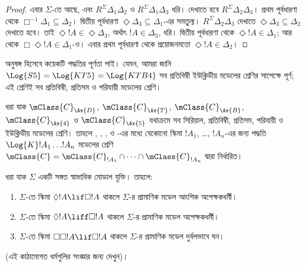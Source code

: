 \documentclass[../../../include/open-logic-section]{subfiles}
\begin{document}
\begin{proof}
  এবার $\Sigma$-তে  আছে, এবং $R^\Sigma
  \Delta_1\Delta_2$ ও $R^\Sigma \Delta_1\Delta_3$ ধরি। দেখাতে হবে $R^\Sigma \Delta_2\Delta_3$। প্রথম পূর্বধারণা থেকে $\Box^{-1}\Delta_1 \subseteq \Delta_2$। দ্বিতীয় পূর্বধারণা $\Diamond\Delta_3 \subseteq \Delta_1$-এর সমতুল্য। $R^\Sigma
  \Delta_2\Delta_3$ দেখাতে $\Diamond\Delta_3 \subseteq \Delta_2$ দেখাতে হবে। তাই $\Diamond!A \in
  \Diamond\Delta_3$, অর্থাৎ $!A \in \Delta_3$, ধরি। দ্বিতীয় পূর্বধারণা থেকে $\Diamond!A \in \Delta_1$; আর  থেকে $\Box\Diamond!A \in
  \Delta_1$-ও। এবার প্রথম পূর্বধারণা থেকে প্রয়োজনমতো $\Diamond!A \in
  \Delta_2$।
  \end{proof}

অনুষঙ্গ হিসেবে কয়েকটি পদ্ধতির পূর্ণতা পাই। যেমন, আমরা জানি $\Log{S5} = \Log{KT5} =
\Log{KTB4}$ সব প্রতিবিম্বী ইউক্লিডীয় মডেলের শ্রেণির সাপেক্ষে পূর্ণ; এই শ্রেণিই সব প্রতিবিম্বী, প্রতিসম ও পরিযায়ী মডেলের শ্রেণি।

\begin{thm}
  ধরা যাক $\mClass{C}_\Ax{D}$, $\mClass{C}_\Ax{T}$,
  $\mClass{C}_\Ax{B}$, $\mClass{C}_\Ax{4}$ ও
  $\mClass{C}_\Ax{5}$ যথাক্রমে সব সিরিয়াল, প্রতিবিম্বী, প্রতিসম, পরিযায়ী ও ইউক্লিডীয় মডেলের শ্রেণি। তাহলে ,
  , ,  ও -এর মধ্যে যেকোনো স্কিমা $!A_1$, \dots, $!A_n$-এর জন্য পদ্ধতি
  $\Log{K}!A_1 \dots !A_n$ মডেলের শ্রেণি $\mClass{C} = \mClass{C}_{!A_1} \cap \dots
  \cap \mClass{C}_{!A_n}$ দ্বারা নির্ধারিত।
\end{thm}

\begin{prop}
  ধরা যাক $\Sigma$ একটি সঙ্গত স্বাভাবিক মোডাল যুক্তি। তাহলে:
  \begin{enumerate}
  \item{}%
    $\Sigma$-তে স্কিমা $\Diamond!A \lif \Box
    !A$ থাকলে $\Sigma$-র প্রামাণিক মডেল আংশিক অপেক্ষকধর্মী।
  \item $\Sigma$-তে স্কিমা $\Diamond!A \liff \Box
    !A$ থাকলে $\Sigma$-র প্রামাণিক মডেল অপেক্ষকধর্মী।
  \item $\Sigma$-তে স্কিমা $\Box\Box!A \lif \Box
    !A$ থাকলে $\Sigma$-র প্রামাণিক মডেল দুর্বলভাবে ঘন।
  \end{enumerate}
(এই কাঠামোগত ধর্মগুলির সংজ্ঞার জন্য  দেখুন)।
\end{prop}
\end{document}
